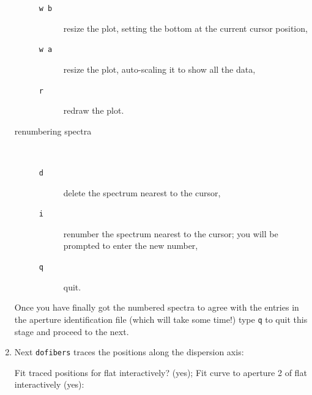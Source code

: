 \documentclass[chapters,twoside,11pt]{starlink}
\begin{document}
\begin{enumerate}
\begin{description}
\begin{description}
      \item[\texttt{w~b}] resize the plot, setting the bottom at the
       current cursor position,

      \item[\texttt{w~a}] resize the plot, auto-scaling it to show all
       the data,

      \item[\texttt{r}] redraw the plot.

    \end{description}

    \item[renumbering spectra] ~

    \begin{description}

      \item[\texttt{d}] delete the spectrum nearest to the cursor,

      \item[\texttt{i}] renumber the spectrum nearest to the cursor;
       you will be prompted to enter the new number,

      \item[\texttt{q}] quit.

    \end{description}

  \end{description}

   Once you have finally got the numbered spectra to agree with the
   entries in the aperture identification file (which will take some
   time!) type \texttt{q} to quit this stage and proceed to the next.

  \item Next \texttt{dofibers} traces the positions along the dispersion
   axis:

\begin{terminalv}
Fit traced positions for flat interactively?  (yes);
Fit curve to aperture 2 of flat interactively  (yes):
\end{terminalv}


\end{enumerate}
\end{document}
